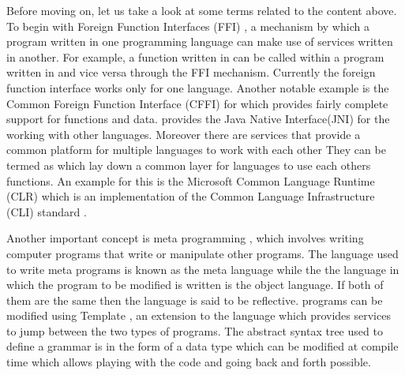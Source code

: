 \documentclass[thesis-solanki.tex]{subfiles}
\begin{document}
Before moving on, let us take a look at some terms related to the content above.
To begin with Foreign Function Interfaces (FFI) \cite{website:ffiwiki}, a mechanism by which a program written in
one programming language can make use of services written in another.
For example, a function written in  can be called within a program written in  and
vice versa through the FFI mechanism.
Currently the  foreign function interface works only for one language.
Another notable example is the Common Foreign Function Interface (CFFI) \cite{website:commonlisp} for
 which provides fairly complete support for  functions and data.
 provides the Java Native Interface(JNI) for the working with other languages.
Moreover there are services that provide a common platform for multiple languages to work with each other 
They can be termed as 
which lay down a common layer for languages to use each others
functions.
An example for this is the Microsoft Common Language Runtime (CLR) \cite{website:clrwiki} which is an
implementation of the Common Language Infrastructure (CLI) standard \cite{website:cliwiki}.

Another important concept is meta programming \cite{website:metaprogwiki}, which involves writing computer programs
that write or manipulate other programs.
The language used to write meta programs is known as the meta language while the the language in which the program
to be modified is written is the object language.
If both of them are the same then the language is said to be reflective.
 programs can be modified using Template  \cite{website:templatehaskell}, an
extension to the language which provides services to jump between the two types of programs.
The abstract syntax tree used to define a grammar is in the form of a  data type which can be
modified at compile time which allows playing with the code and going back and forth possible.
\end{document}

